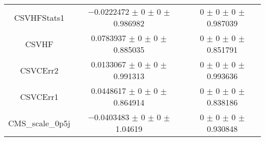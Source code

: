 \begin{table}
\begin{tabular}{ccc}
CSVHFStats1 	& \num{-0.0222472} $\pm$ \num{0} $\pm$ \num{0} $\pm$ \num{0.986982} 	& \num{0} $\pm$ \num{0} $\pm$ \num{0} $\pm$ \num{0.987039}\\
CSVHF 	& \num{0.0783937} $\pm$ \num{0} $\pm$ \num{0} $\pm$ \num{0.885035} 	& \num{0} $\pm$ \num{0} $\pm$ \num{0} $\pm$ \num{0.851791}\\
CSVCErr2 	& \num{0.0133067} $\pm$ \num{0} $\pm$ \num{0} $\pm$ \num{0.991313} 	& \num{0} $\pm$ \num{0} $\pm$ \num{0} $\pm$ \num{0.993636}\\
CSVCErr1 	& \num{0.0448617} $\pm$ \num{0} $\pm$ \num{0} $\pm$ \num{0.864914} 	& \num{0} $\pm$ \num{0} $\pm$ \num{0} $\pm$ \num{0.838186}\\
CMS\_scale\_0p5j 	& \num{-0.0403483} $\pm$ \num{0} $\pm$ \num{0} $\pm$ \num{1.04619} 	& \num{0} $\pm$ \num{0} $\pm$ \num{0} $\pm$ \num{0.930848}\\
\bottomrule
\end{tabular}
\end{table}